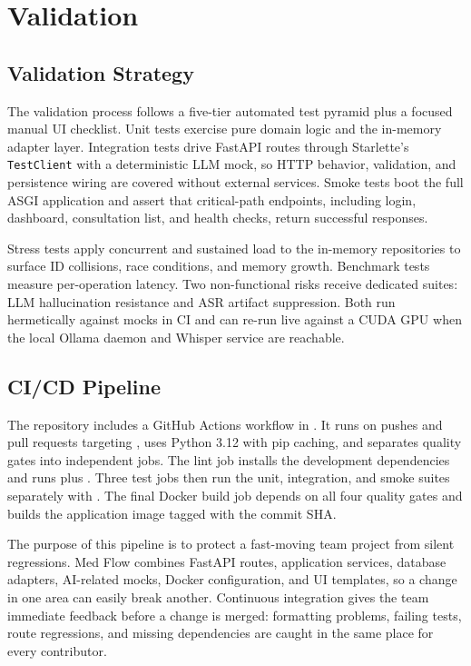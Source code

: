 \section{Validation}
\label{sec:validation}

\subsection{Validation Strategy}
\label{subsec:validation-strategy}

The validation process follows a five-tier automated test pyramid plus a focused manual UI checklist. Unit tests exercise pure domain logic and the in-memory adapter layer. Integration tests drive FastAPI routes through Starlette's \texttt{TestClient} with a deterministic LLM mock, so HTTP behavior, validation, and persistence wiring are covered without external services. Smoke tests boot the full ASGI application and assert that critical-path endpoints, including login, dashboard, consultation list, and health checks, return successful responses.

Stress tests apply concurrent and sustained load to the in-memory repositories to surface ID collisions, race conditions, and memory growth. Benchmark tests measure per-operation latency. Two non-functional risks receive dedicated suites: LLM hallucination resistance and ASR artifact suppression. Both run hermetically against mocks in CI and can re-run live against a CUDA GPU when the local Ollama daemon and Whisper service are reachable.

\subsection{CI/CD Pipeline}
\label{subsec:cicd-pipeline}

The repository includes a GitHub Actions workflow in . It runs on pushes and pull requests targeting , uses Python 3.12 with pip caching, and separates quality gates into independent jobs. The lint job installs the development dependencies and runs  plus . Three test jobs then run the unit, integration, and smoke suites separately with . The final Docker build job depends on all four quality gates and builds the application image tagged with the commit SHA.

The purpose of this pipeline is to protect a fast-moving team project from silent regressions. Med Flow combines FastAPI routes, application services, database adapters, AI-related mocks, Docker configuration, and UI templates, so a change in one area can easily break another. Continuous integration gives the team immediate feedback before a change is merged: formatting problems, failing tests, route regressions, and missing dependencies are caught in the same place for every contributor.

